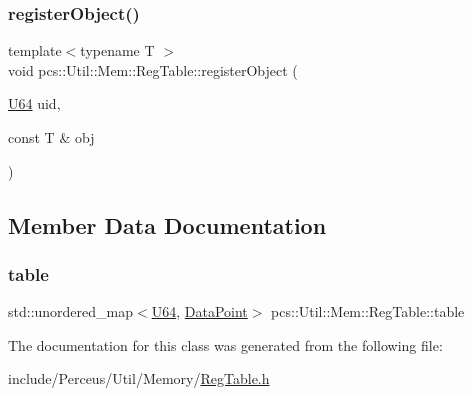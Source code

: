 \subsubsection{\texorpdfstring{register\+Object()}{registerObject()}\hspace{0.1cm}{\footnotesize\ttfamily [2/2]}}
{\footnotesize\ttfamily template$<$typename T $>$ \\
void pcs\+::\+Util\+::\+Mem\+::\+Reg\+Table\+::register\+Object (\begin{DoxyParamCaption}\item[{\hyperlink{namespacepcs_1_1Util_1_1Mem_ab390aefcd13d26db4db397b784b4b9c6}{U64}}]{uid,  }\item[{const T \&}]{obj }\end{DoxyParamCaption})\hspace{0.3cm}{\ttfamily [inline]}}



\subsection{Member Data Documentation}
\mbox{\label{classpcs_1_1Util_1_1Mem_1_1RegTable_a00dba5deb5b8f0b1ce83dc1f90a2187f}} 
\subsubsection{\texorpdfstring{table}{table}}
{\footnotesize\ttfamily std\+::unordered\+\_\+map$<$\hyperlink{namespacepcs_1_1Util_1_1Mem_ab390aefcd13d26db4db397b784b4b9c6}{U64}, \hyperlink{structpcs_1_1Util_1_1Mem_1_1DataPoint}{Data\+Point}$>$ pcs\+::\+Util\+::\+Mem\+::\+Reg\+Table\+::table\hspace{0.3cm}{\ttfamily [private]}}



The documentation for this class was generated from the following file\+:\begin{DoxyCompactItemize}
\item 
include/\+Perceus/\+Util/\+Memory/\hyperlink{RegTable_8h}{Reg\+Table.\+h}\end{DoxyCompactItemize}
